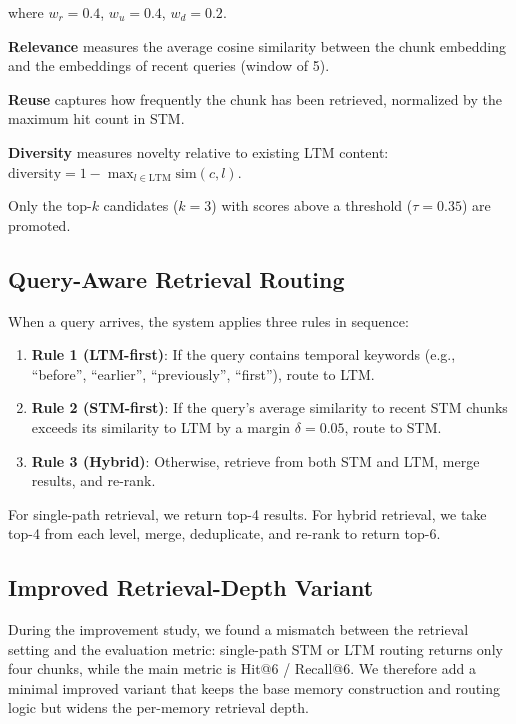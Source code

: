 \documentclass{article}
\begin{document}
where $w_r = 0.4$, $w_u = 0.4$, $w_d = 0.2$.

\textbf{Relevance} measures the average cosine similarity between the chunk embedding and the embeddings of recent queries (window of 5).

\textbf{Reuse} captures how frequently the chunk has been retrieved, normalized by the maximum hit count in STM.

\textbf{Diversity} measures novelty relative to existing LTM content: $\text{diversity} = 1 - \max_{l \in \text{LTM}} \text{sim}(c, l)$.

Only the top-$k$ candidates ($k=3$) with scores above a threshold ($\tau = 0.35$) are promoted.

\subsection{Query-Aware Retrieval Routing}

When a query arrives, the system applies three rules in sequence:

\begin{enumerate}
    \item \textbf{Rule 1 (LTM-first)}: If the query contains temporal keywords (e.g., ``before'', ``earlier'', ``previously'', ``first''), route to LTM.
    \item \textbf{Rule 2 (STM-first)}: If the query's average similarity to recent STM chunks exceeds its similarity to LTM by a margin $\delta = 0.05$, route to STM.
    \item \textbf{Rule 3 (Hybrid)}: Otherwise, retrieve from both STM and LTM, merge results, and re-rank.
\end{enumerate}

For single-path retrieval, we return top-4 results. For hybrid retrieval, we take top-4 from each level, merge, deduplicate, and re-rank to return top-6.

\subsection{Improved Retrieval-Depth Variant}

During the improvement study, we found a mismatch between the retrieval setting and the evaluation metric: single-path STM or LTM routing returns only four chunks, while the main metric is Hit@6 / Recall@6. We therefore add a minimal improved variant that keeps the base memory construction and routing logic but widens the per-memory retrieval depth.
\end{document}
